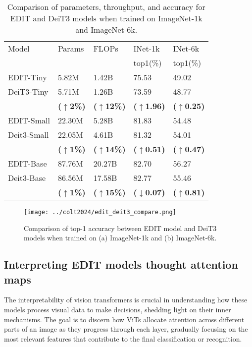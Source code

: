 \begin{table} [h!]
  \centering
  \begin{tabular}{l|llll}
    \toprule
    Model & Params & FLOPs & INet-1k  & INet-6k  \\
     &  &  & top1(\%) & top1(\%) \\
    \midrule
    EDIT-Tiny & 5.82M & 1.42B & 75.53 & 49.02 \\
    DeiT3-Tiny & 5.71M & 1.26B & 73.59 & 48.77 \\
    & \small\textbf{($\uparrow$2\%)} & \small\textbf{($\uparrow$12\%)} & \small\textbf{($\uparrow$1.96)} &  \small\textbf{($\uparrow$0.25)} \\
    \midrule
    EDIT-Small & 22.30M & 5.28B & 81.83 & 54.48 \\
    Deit3-Small & 22.05M & 4.61B & 81.32 & 54.01 \\
    & \small\textbf{($\uparrow$1\%)} & \small\textbf{($\uparrow$14\%)} & \small\textbf{($\uparrow$0.51)} & \small\textbf{($\uparrow$0.47)} \\
    \midrule
    EDIT-Base & 87.76M & 20.27B & 82.70 & 56.27 \\
    Deit3-Base & 86.56M & 17.58B & 82.77 & 55.46 \\
    & \small\textbf{($\uparrow$1\%)} & \small\textbf{($\uparrow$15\%)} & \small\textbf{($\downarrow$0.07)} & \small\textbf{($\uparrow$0.81)} \\
    \bottomrule
  \end{tabular}
  \caption{Comparison of parameters, throughput, and accuracy for EDIT and DeiT3 models when trained on ImageNet-1k and ImageNet-6k.}
  \label{tab:comparison-edit-deit3}
\end{table}

\begin{figure}[t]
  \centering
  \texttt{[image: ../colt2024/edit\_deit3\_compare.png]}
  \caption{Comparison of top-1 accuracy between EDIT model and DeiT3 models when trained on (a) ImageNet-1k and (b) ImageNet-6k.}\label{fig:comparison-edit-deit3}
\end{figure}

\subsection{Interpreting EDIT models thought attention maps}

The interpretability of vision transformers \cite{10657171,9577970,abnar-zuidema-2020-quantifying,kashefi2023explainability} is crucial in understanding how these models process visual data to make decisions, shedding light on their inner mechanisms.
The goal is to discern how ViTs allocate attention across different parts of an image as they progress through each layer, gradually focusing on the most relevant features that contribute to the final classification or recognition.

